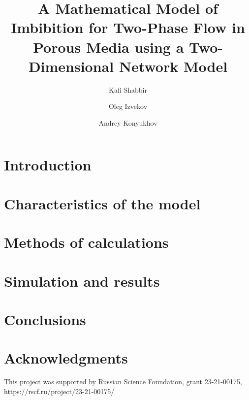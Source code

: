 \documentclass[
	12pt
] {article}
\title{A Mathematical Model of Imbibition for Two-Phase Flow in Porous Media using a Two-Dimensional Network Model}
\author[1]{Kafi Shabbir}
\author[1]{Oleg Izvekov}
\author[1]{Andrey Konyukhov}
\affil[1]{Moscow Institute of Physics and Technology}
\begin{document}
	\nocite{*}
	\maketitle
	
	\begin{abstract}
		
	\end{abstract}
		
	\section{Introduction}
		
		
	\section{Characteristics of the model}
		
		
	\section{Methods of calculations}
		

	\section{Simulation and results}
		

	\section{Conclusions}
		
		
	\section{Acknowledgments}
		This project was supported by Russian Science Foundation, grant 23-21-00175, https://rscf.ru/project/23-21-00175/
		
	
	
		
\end{document}
